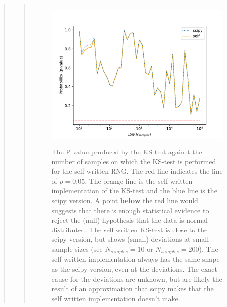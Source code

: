 \begin{quote}
\begin{quote}
\begin{figure}[!hb]
\centering
\includegraphics[width=12cm, height=7.5cm]{./Plots/1_plot_ks_test_self_scipy.pdf}
\caption{The P-value produced by the KS-test against the number of samples on which the KS-test is performed for the self written RNG. The red line indicates the line of $ p = 0.05$. The orange line is the self written implementation of the KS-test and the blue line is the scipy version.  A point \textbf{below} the red line would suggests that there is enough statistical evidence to reject the (null) hypothesis that the data is normal distributed. The self written KS-test is  close to the scipy version, but shows (small) deviations at small sample sizes (see $N_{samples} = 10$ or $N_{samples} = 200$).  The self written implementation always has the same shape as the scipy version, even at the deviations. The exact cause for the deviations are unknown, but are likely the result of an approximation that scipy makes that the self written implementation doesn't make. }
\end{figure}
\end{quote}

\end{quote}



%

%


%











